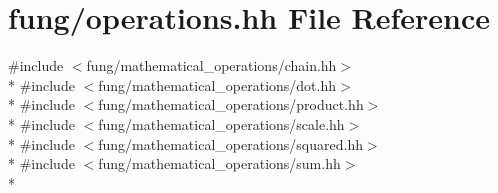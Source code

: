 \hypertarget{operations_8hh}{\section{fung/operations.hh File Reference}
\label{operations_8hh}
}
{\ttfamily \#include $<$fung/mathematical\-\_\-operations/chain.\-hh$>$}\\*
{\ttfamily \#include $<$fung/mathematical\-\_\-operations/dot.\-hh$>$}\\*
{\ttfamily \#include $<$fung/mathematical\-\_\-operations/product.\-hh$>$}\\*
{\ttfamily \#include $<$fung/mathematical\-\_\-operations/scale.\-hh$>$}\\*
{\ttfamily \#include $<$fung/mathematical\-\_\-operations/squared.\-hh$>$}\\*
{\ttfamily \#include $<$fung/mathematical\-\_\-operations/sum.\-hh$>$}\\*
